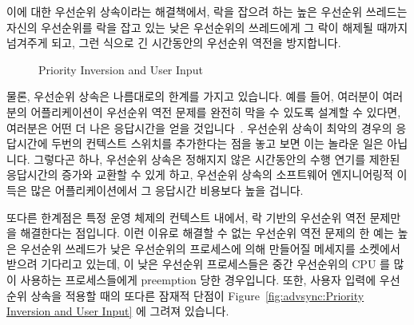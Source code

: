 이에 대한 우선순위 상속이라는 해결책에서, 락을 잡으려 하는 높은 우선순위
쓰레드는 자신의 우선순위를 락을 잡고 있는 낮은 우선순위의 쓰레드에게 그 락이
해제될 때까지 넘겨주게 되고, 그런 식으로 긴 시간동안의 우선순위 역전을
방지합니다.

\begin{figure}[tb]
\centering
{}
\caption{Priority Inversion and User Input}
\end{figure}

물론, 우선순위 상속은 나름대로의 한계를 가지고 있습니다.
예를 들어, 여러분이 여러분의 어플리케이션이 우선순위 역전 문제를 완전히 막을 수
있도록 설계할 수 있다면, 여러분은 어떤 더 나은 응답시간을 얻을
것입니다~\cite{VictorYodaiken2004a}.
우선순위 상속이 최악의 경우의 응답시간에 두번의 컨텍스트 스위치를 추가한다는
점을 놓고 보면 이는 놀라운 일은 아닙니다.
그렇다곤 하나, 우선순위 상속은 정해지지 않은 시간동안의 수행 연기를 제한된
응답시간의 증가와 교환할 수 있게 하고, 우선순위 상속의 소프트웨어 엔지니어링적
이득은 많은 어플리케이션에서 그 응답시간 비용보다 높을 겁니다.

또다른 한계점은 특정 운영 체제의 컨텍스트 내에서, 락 기반의 우선순위 역전
문제만을 해결한다는 점입니다.
이런 이유로 해결할 수 없는 우선순위 역전 문제의 한 예는 높은 우선순위 쓰레드가
낮은 우선순위의 프로세스에 의해 만들어질 메세지를 소켓에서 받으려 기다리고
있는데, 이 낮은 우선순위 프로세스들은 중간 우선순위의 CPU 를 많이 사용하는
프로세스들에게 preemption 당한  경우입니다.
또한, 사용자 입력에 우선순위 상속을 적용할 때의 또다른 잠재적 단점이
Figure~\ref{fig:advsync:Priority Inversion and User Input} 에 그려져 있습니다.
\iffalse

